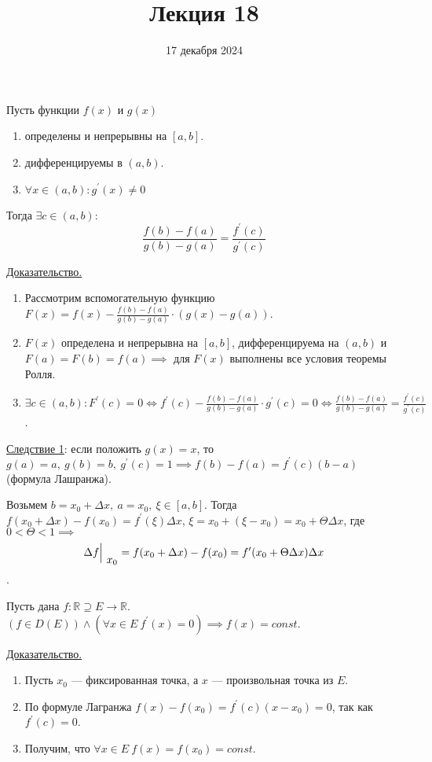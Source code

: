 \documentclass{article}
\title{Лекция 18}
\author{17 декабря 2024}
\date{}
\begin{document}
\maketitle
  
\begin{theorem}[Коши]
    Пусть функции \(f(x)\) и \(g(x)\)
    \begin{enumerate}
        \item определены и непрерывны на \({[a, b]}\).
        \item дифференцируемы в \({(a, b)}\).
        \item \(\forall x \in (a, b): g^{\prime}(x) \neq 0\)    
    \end{enumerate}
    Тогда \(\exists c \in (a, b):\) 
    \[
        \frac{f(b) - f(a)}{g(b) - g(a)} = \frac{f^{\prime}(c)}{g^{\prime}(c)}
    \]
\end{theorem}
\noindent \underline{Доказательство.}
\begin{enumerate}
    \item Рассмотрим вспомогательную функцию \(\displaystyle F(x) = f(x) - \frac{f(b) - f(a)}{g(b) - g(a)} \cdot (g(x) - g(a))\).
    \item \(F(x)\) определена и непрерывна на \({[a, b]}\), дифференцируема на \((a, b)\) и \(F(a) = F(b) = f(a) \implies \) для \(F(x)\) выполнены все условия теоремы Ролля.
    \item \(\displaystyle \exists c \in (a, b): F^{\prime}(c) = 0 \iff f^{\prime}(c) - \frac{f(b) - f(a)}{g(b) - g(a)} \cdot g^{\prime}(c) = 0 \iff \frac{f(b) - f(a)}{g(b) - g(a)} = \frac{f^{\prime}(c)}{g^{\prime}(c)}\).  
\end{enumerate}
\noindent \underline{Следствие 1}: если положить \(g(x) = x\), то \(g(a) = a,\ g(b) = b,\ g^{\prime}(c) = 1 \implies f(b) - f(a) = f^{\prime}(c)(b - a)\) (формула Лашранжа).

\begin{claim}
    Возьмем \(b = x_0 + \Delta x,\ a = x_0,\ \xi \in [a, b]\). Тогда \(f(x_0 + \Delta x) -f(x_0) = f^{\prime}(\xi) \Delta x\), \(\xi = x_0 + (\xi -x _0) = x_0 + \Theta \Delta x\), где \(0< \Theta < 1 \implies \)
    \[\at{\Delta f}{x_0} = f(x_0 + \Delta x) - f(x_0) = f^{\prime}(x_0 + \Theta \Delta x) \Delta x\].    
\end{claim}

\begin{theorem}
    Пусть дана \(f: \mathbb{R}  \supseteq E \to \mathbb{R}\).
    \((f \in D(E)) \land (\forall x \in E\ f^{\prime}(x) = 0) \implies f(x) = const\).
\end{theorem}
\noindent \underline{Доказательство.}
\begin{enumerate}
    \item Пусть \(x_0\) --- фиксированная точка, а \(x\) --- произвольная точка из \(E\).
    \item По формуле Лагранжа \(f(x) - f(x_0) = f^{\prime}(c)(x - x_0) = 0\), так как \(f^{\prime}(c) = 0\).
    \item Получим, что \(\forall x \in E\ f(x) = f(x_0) = const\).   
\end{enumerate}
\end{document}
